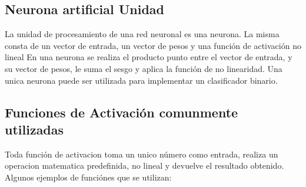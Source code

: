 \documentclass[a4paper,11pt,spanish]{book}
\begin{document}
      \subsection {Neurona artificial Unidad}
	La unidad de procesamiento de una red neuronal es una neurona. La misma consta de un vector de entrada, un vector de pesos y una función de activación no lineal
	En una neurona se realiza el producto punto entre el vector de entrada, y su vector de pesos, le suma el sesgo y aplica la función de no linearidad.
	Una unica neurona puede ser utilizada para implementar un clasificador binario.

      \subsection {Funciones de Activación comunmente utilizadas}
	Toda función de activacion toma un unico número como entrada, realiza un operacion matematica predefinida, no lineal y devuelve el resultado obtenido.
	Algunos ejemplos de funciónes que se utilizan:
\end{document}
